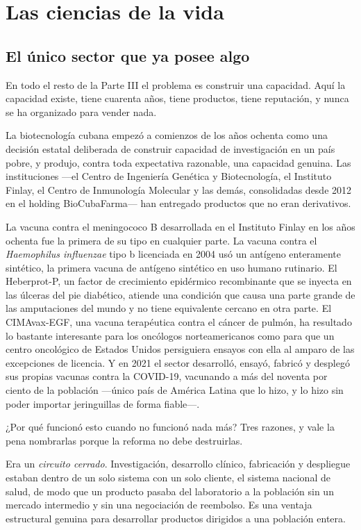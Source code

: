 \chapter{Las ciencias de la vida}
\label{ch:life}

\section{El único sector que ya posee algo}

En todo el resto de la Parte III el problema es construir una capacidad. Aquí la capacidad
existe, tiene cuarenta años, tiene productos, tiene reputación, y nunca se ha organizado
para vender nada.

La biotecnología cubana empezó a comienzos de los años ochenta como una decisión estatal
deliberada de construir capacidad de investigación en un país pobre, y produjo, contra toda
expectativa razonable, una capacidad genuina. Las instituciones ---el Centro de Ingeniería
Genética y Biotecnología, el Instituto Finlay, el Centro de Inmunología Molecular y las
demás, consolidadas desde 2012 en el holding BioCubaFarma--- han entregado productos que no
eran derivativos.

La vacuna contra el meningococo B desarrollada en el Instituto Finlay en los años ochenta
fue la primera de su tipo en cualquier parte. La vacuna contra el \emph{Haemophilus
influenzae} tipo b licenciada en 2004 usó un antígeno enteramente sintético, la primera
vacuna de antígeno sintético en uso humano rutinario. El Heberprot-P, un factor de
crecimiento epidérmico recombinante que se inyecta en las úlceras del pie diabético,
atiende una condición que causa una parte grande de las amputaciones del mundo y no tiene
equivalente cercano en otra parte. El CIMAvax-EGF, una vacuna terapéutica contra el cáncer
de pulmón, ha resultado lo bastante interesante para los oncólogos norteamericanos como
para que un centro oncológico de Estados Unidos persiguiera ensayos con ella al amparo de
las excepciones de licencia. Y en 2021 el sector desarrolló, ensayó, fabricó y desplegó sus
propias vacunas contra la COVID-19, vacunando a más del noventa por ciento de la población
---único país de América Latina que lo hizo, y lo hizo sin poder importar jeringuillas de
forma fiable---.\unv{}

¿Por qué funcionó esto cuando no funcionó nada más? Tres razones, y vale la pena nombrarlas
porque la reforma no debe destruirlas.

Era un \emph{circuito cerrado}. Investigación, desarrollo clínico, fabricación y despliegue
estaban dentro de un solo sistema con un solo cliente, el sistema nacional de salud, de modo
que un producto pasaba del laboratorio a la población sin un mercado intermedio y sin una
negociación de reembolso. Es una ventaja estructural genuina para desarrollar productos
dirigidos a una población entera.

